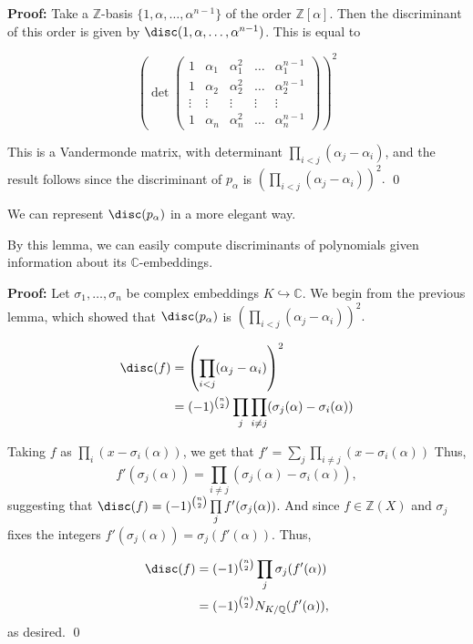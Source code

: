 \documentclass[a4paper, 12pt,oneside,openany]{book}
\begin{document}
\textbf{Proof:} Take a $\mathbb{Z}$-basis $\{1, \alpha, \dots, \alpha^{n-1}\}$ of the order $\mathbb{Z}[\alpha]$. Then the discriminant of this order is given by $\disc(1, \alpha, \dots, \alpha^{n-1})$. This is equal to 

$$\left(\det\begin{pmatrix}
    1 & \alpha_1 & \alpha_1^2 & \dots & \alpha_1^{n-1}\\
    1 & \alpha_2 & \alpha_2^2 & \dots & \alpha_2^{n-1}\\
    \vdots & \vdots & \vdots & \vdots & \vdots \\
    1 & \alpha_n & \alpha_n^2 & \dots & \alpha_n^{n-1}
\end{pmatrix}\right)^2$$

This is a Vandermonde matrix, with determinant $\prod\limits_{i<j}(\alpha_j-\alpha_i)$, and the result follows since the discriminant of $p_{\alpha}$ is $\left(\prod\limits_{i<j}(\alpha_j-\alpha_i)\right)^2.$ \qed

We can represent $\disc(p_{\alpha})$ in a more elegant way. 


By this lemma, we can easily compute discriminants of polynomials given information about its $\mathbb{C}$-embeddings. 

\textbf{Proof:} Let $\sigma_1, \dots, \sigma_n$ be complex embeddings $K \hookrightarrow \mathbb{C}.$ We begin from the previous lemma, which showed that $\disc(p_{\alpha})$ is $\left(\prod\limits_{i<j}(\alpha_j-\alpha_i)\right)^2.$ 

\begin{align*}
    \disc(f)&=\left(\prod\limits_{i<j}(\alpha_j-\alpha_i)\right)^2\\
    &= (-1)^{\binom{n}{2}} \prod\limits_j \prod\limits_{i\neq j} (\sigma_j(\alpha)-\sigma_i(\alpha))
\end{align*}

Taking $f$ as $\prod_i(x-\sigma_i(\alpha))$, we get that $f'=\sum_j \prod_{i\neq j} (x-\sigma_i(\alpha))$ Thus, $$f'(\sigma_j(\alpha)) = \prod\limits_{i\neq j} (\sigma_j(\alpha)-\sigma_i(\alpha)),$$ suggesting that $\disc(f) = (-1)^{\binom{n}{2}} \prod\limits_j f'(\sigma_j(\alpha))$. And since $f \in \mathbb{Z}(X)$ and $\sigma_j$ fixes the integers $f'(\sigma_j(\alpha))=\sigma_j(f'(\alpha)).$ Thus,

\begin{align*}
    \disc(f)&=(-1)^{\binom{n}{2}} \prod\limits_j \sigma_j(f'(\alpha))\\
    &= (-1)^{\binom{n}{2}} N_{K/\mathbb{Q}}(f'(\alpha)),
\end{align*} as desired. \qed
\end{document}
